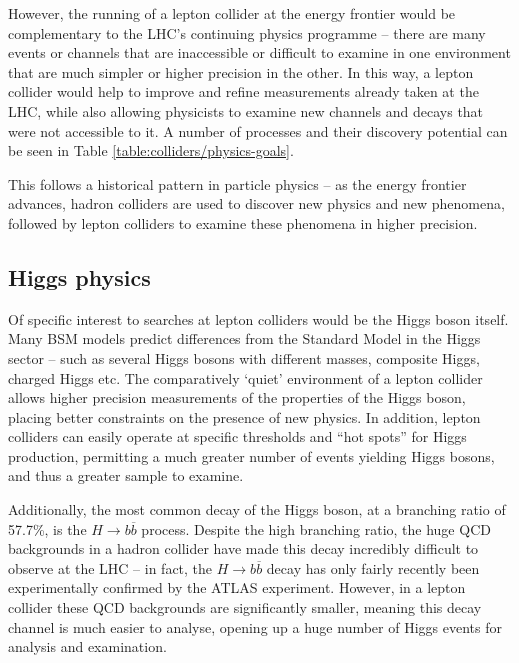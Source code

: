 However, the running of a lepton collider at the energy frontier would be complementary to the \acrshort{LHC}'s continuing physics programme -- there are many events or channels that are inaccessible or difficult to examine in one environment that are much simpler or higher precision in the other. In this way, a lepton collider would help to improve and refine measurements already taken at the \acrshort{LHC}, while also allowing physicists to examine new channels and decays that were not accessible to it. A number of processes and their discovery potential can be seen in Table \ref{table:colliders/physics-goals}.

This follows a historical pattern in particle physics -- as the energy frontier advances, hadron colliders are used to discover new physics and new phenomena, followed by lepton colliders to examine these phenomena in higher precision.

\subsection{Higgs physics}
Of specific interest to searches at lepton colliders would be the Higgs boson itself. Many \acrshort{BSM} models predict differences from the Standard Model in the Higgs sector -- such as several Higgs bosons with different masses, composite Higgs, charged Higgs etc. The comparatively `quiet' environment of a lepton collider allows higher precision measurements of the properties of the Higgs boson, placing better constraints on the presence of new physics. In addition, lepton colliders can easily operate at specific thresholds and ``hot spots'' for Higgs production, permitting a much greater number of events yielding Higgs bosons, and thus a greater sample to examine.

Additionally, the most common decay of the Higgs boson, at a branching ratio of 57.7\%, is the $H \rightarrow b \overline{b}$ process. Despite the high branching ratio, the huge \acrshort{QCD} backgrounds in a hadron collider have made this decay incredibly difficult to observe at the LHC -- in fact, the $H \rightarrow b \overline{b}$ decay has only fairly recently been experimentally confirmed by the \acrshort{ATLAS} experiment. However, in a lepton collider these \acrshort{QCD} backgrounds are significantly smaller, meaning this decay channel is much easier to analyse, opening up a huge number of Higgs events for analysis and examination.

